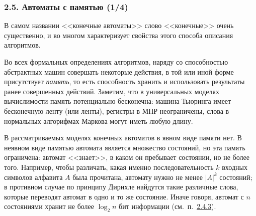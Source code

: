 \documentclass[mathserif,12pt,aspectratio=169]{beamer}
\def\emразделенной{\em разделенной}
\def\em#1{\it\color{blue}#1}
\def\DMref#1#2{{\color{blue}\underline{\hyperlink{#2}{#1}}}}
\begin{document}
\begin{frame}
\frametitle{2.5. Автоматы с памятью (1/4)}

В самом названии <<конечные автоматы>> слово <<конечные>> очень существенно, и
во многом характеризует свойства этого способа описания алгоритмов.

\smallskip
Во всех формальных определениях алгоритмов, наряду со способностью абстрактных
машин совершать некоторые действия, в той или иной форме присутствует
{\em память}, то есть способность хранить и использовать результаты ранее
совершенных действий. Заметим, что в универсальных моделях вычислимости память
потенциально бесконечна: машина Тьюринга имеет бесконечную ленту (или ленты),
регистры в МНР неограничены, слова в нормальных алгорифмах Маркова могут иметь
любую длину.

\smallskip
В рассматриваемых моделях конечных автоматов в явном виде памяти нет. В неявном
виде памятью автомата является множество состояний, но эта память ограничена:
автомат <<знает>>, в каком он пребывает состоянии, но не более того.
Например, 
чтобы различать, какая именно последовательность $k$ входных символов 
алфавита $A$ была прочитана,
автомату нужно не менее $|A|^k$ состояний;
в противном случае по принципу Дирихле  найдутся такие различные слова,
которые переводят автомат в одно и то же состояние.
Иначе говоря, автомат с $n$
состояниями хранит не более $\log_2 n$ бит информации
(см.~п.~\DMref{2.4.3}{2.4.3.}).
\end{frame}
\end{document}
